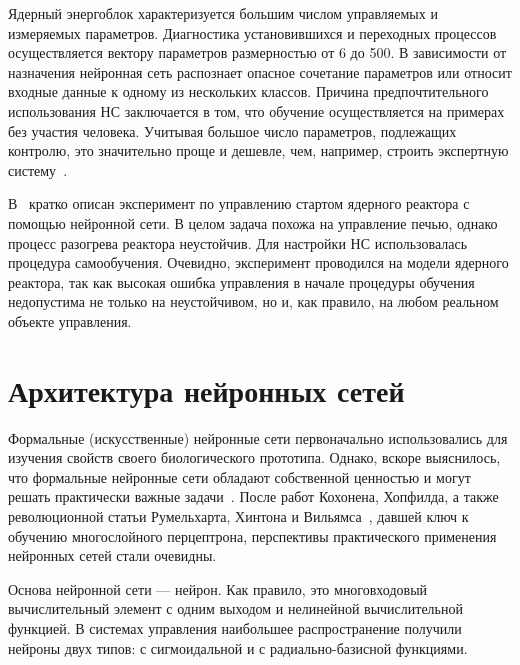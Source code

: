 Ядерный энергоблок характеризуется большим числом управляемых и
измеряемых параметров.  Диагностика установившихся и переходных
процессов осуществляется вектору параметров размерностью от 6 до 500.
В зависимости от назначения нейронная сеть распознает опасное
сочетание параметров или относит входные данные к одному из нескольких
классов.  Причина предпочтительного использования НС заключается в
том, что обучение осуществляется на примерах без участия человека.
Учитывая большое число параметров, подлежащих контролю, это
значительно проще и дешевле, чем, например, строить экспертную
систему~\cite{basubart94}.

В~\cite{uhrig91} кратко описан эксперимент по управлению стартом
ядерного реактора с помощью нейронной сети.  В целом задача похожа на
управление печью, однако процесс разогрева реактора неустойчив.  Для
настройки НС использовалась процедура самообучения.  Очевидно,
эксперимент проводился на модели ядерного реактора, так как высокая
ошибка управления в начале процедуры обучения недопустима не только на
неустойчивом, но и, как правило, на любом реальном объекте управления.

\section{Архитектура нейронных сетей}


Формальные (искусственные) нейронные сети первоначально использовались
для изучения свойств своего биологического прототипа.  Однако, вскоре
выяснилось, что формальные нейронные сети обладают собственной
ценностью и могут решать практически важные задачи~\cite{wasser92}.
После работ Кохонена, Хопфилда, а также революционной статьи
Румельхарта, Хинтона и Вильямса~\cite{rumelhart86}, давшей ключ к
обучению многослойного перцептрона, перспективы практического
применения нейронных сетей стали очевидны.

Основа нейронной сети --- нейрон.  Как правило, это многовходовый
вычислительный элемент с одним выходом и нелинейной вычислительной
функцией.  В системах управления наибольшее распространение получили
нейроны двух типов: с сигмоидальной и с радиально-базисной функциями.

